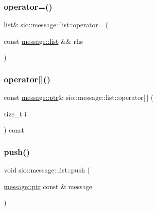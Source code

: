 \mbox{\label{classsio_1_1message_1_1list_aa03648f0cfb2945889ce6570f85e3a90}} 
\subsubsection{\texorpdfstring{operator=()}{operator=()}}
{\footnotesize\ttfamily \hyperlink{classsio_1_1message_1_1list}{list}\& sio\+::message\+::list\+::operator= (\begin{DoxyParamCaption}\item[{const \hyperlink{classsio_1_1message_1_1list}{message\+::list} \&\&}]{rhs }\end{DoxyParamCaption})\hspace{0.3cm}{\ttfamily [inline]}}

\mbox{\label{classsio_1_1message_1_1list_adc29a3f80b7fd921b88a154dea72fbe0}} 
\subsubsection{\texorpdfstring{operator[]()}{operator[]()}}
{\footnotesize\ttfamily const \hyperlink{classsio_1_1message_a6340b6fef57e4516eb17928b1885a615}{message\+::ptr}\& sio\+::message\+::list\+::operator\mbox{[}$\,$\mbox{]} (\begin{DoxyParamCaption}\item[{size\+\_\+t}]{i }\end{DoxyParamCaption}) const\hspace{0.3cm}{\ttfamily [inline]}}

\mbox{\label{classsio_1_1message_1_1list_a558c9b495a570073a80fbcb4b92a415d}} 
\subsubsection{\texorpdfstring{push()}{push()}\hspace{0.1cm}{\footnotesize\ttfamily [1/5]}}
{\footnotesize\ttfamily void sio\+::message\+::list\+::push (\begin{DoxyParamCaption}\item[{\hyperlink{classsio_1_1message_a6340b6fef57e4516eb17928b1885a615}{message\+::ptr} const \&}]{message }\end{DoxyParamCaption})\hspace{0.3cm}{\ttfamily [inline]}}

